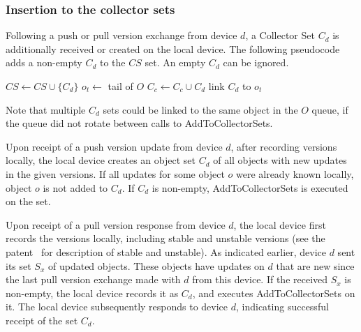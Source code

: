 \subsubsection*{Insertion to the collector sets}

Following a push or pull version exchange from device $d$, a Collector Set $C_d$
is additionally received or created on the local device. The following
pseudocode adds a non-empty $C_d$ to the $CS$ set. An empty $C_d$ can be
ignored.
\begin{algorithmic}
  \State $CS \gets CS \cup \{C_d\}$
  \State $o_t \gets$ tail of $O$
    \State $C_c \gets C_c \cup C_d$
  \Else
    \State link $C_d$ to $o_t$
  \EndIf
\EndFunction
\end{algorithmic}
Note that multiple $C_d$ sets could be linked to the same object in the $O$
queue, if the queue did not rotate between calls to AddToCollectorSets.

Upon receipt of a push version update from device $d$, after recording versions
locally, the local device creates an object set $C_d$ of all objects with new
updates in the given versions. If all updates for some object $o$ were already
known locally, object $o$ is not added to $C_d$. If $C_d$ is non-empty,
AddToCollectorSets is executed on the set.

Upon receipt of a pull version response from device $d$, the local device first
records the versions locally, including stable and unstable versions (see the
patent~\cite{wang:patent2012} for description of stable and unstable). As
indicated earlier, device $d$ sent its set $S_x$ of updated objects. These
objects have updates on $d$ that are new since the last pull version exchange
made with $d$ from this device. If the received $S_x$ is non-empty, the local
device records it as $C_d$, and executes AddToCollectorSets on it. The local
device subsequently responds to device $d$, indicating successful receipt of the
set $C_d$.



